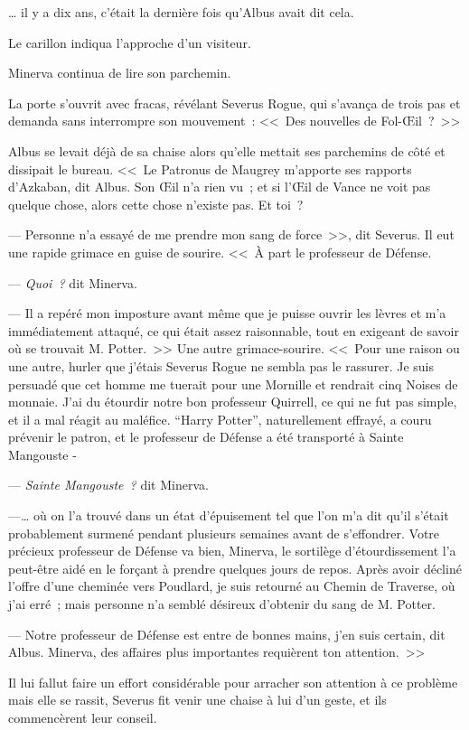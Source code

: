 … il y a dix ans, c'était la dernière fois qu'Albus avait dit cela.

Le carillon indiqua l'approche d'un visiteur.

Minerva continua de lire son parchemin.

La porte s'ouvrit avec fracas, révélant Severus Rogue, qui s'avança de trois pas et demanda sans interrompre son mouvement~: <<~Des nouvelles de Fol-Œil~?~>>

Albus se levait déjà de sa chaise alors qu'elle mettait ses parchemins de côté et dissipait le bureau. <<~Le Patronus de Maugrey m'apporte ses rapports d'Azkaban, dit Albus. Son Œil n'a rien vu~; et si l'Œil de Vance ne voit pas quelque chose, alors cette chose n'existe pas. Et toi~?

--- Personne n'a essayé de me prendre mon sang de force~>>, dit Severus. Il eut une rapide grimace en guise de sourire. <<~À part le professeur de Défense.

--- \emph{Quoi~?} dit Minerva.

--- Il a repéré mon imposture avant même que je puisse ouvrir les lèvres et m'a immédiatement attaqué, ce qui était assez raisonnable, tout en exigeant de savoir où se trouvait M. Potter.~>> Une autre grimace-sourire. <<~Pour une raison ou une autre, hurler que j'étais Severus Rogue ne sembla pas le rassurer. Je suis persuadé que cet homme me tuerait pour une Mornille et rendrait cinq Noises de monnaie. J'ai du étourdir notre bon professeur Quirrell, ce qui ne fut pas simple, et il a mal réagit au maléfice. “Harry Potter”, naturellement effrayé, a couru prévenir le patron, et le professeur de Défense a été transporté à Sainte Mangouste -

--- \emph{Sainte Mangouste~?} dit Minerva.

---… où on l'a trouvé dans un état d'épuisement tel que l'on m'a dit qu'il s'était probablement surmené pendant plusieurs semaines avant de s'effondrer. Votre précieux professeur de Défense va bien, Minerva, le sortilège d'étourdissement l'a peut-être aidé en le forçant à prendre quelques jours de repos. Après avoir décliné l'offre d'une cheminée vers Poudlard, je suis retourné au Chemin de Traverse, où j'ai erré~; mais personne n'a semblé désireux d'obtenir du sang de M. Potter.

--- Notre professeur de Défense est entre de bonnes mains, j'en suis certain, dit Albus. Minerva, des affaires plus importantes requièrent ton attention.~>>

Il lui fallut faire un effort considérable pour arracher son attention à ce problème mais elle se rassit, Severus fit venir une chaise à lui d'un geste, et ils commencèrent leur conseil.

